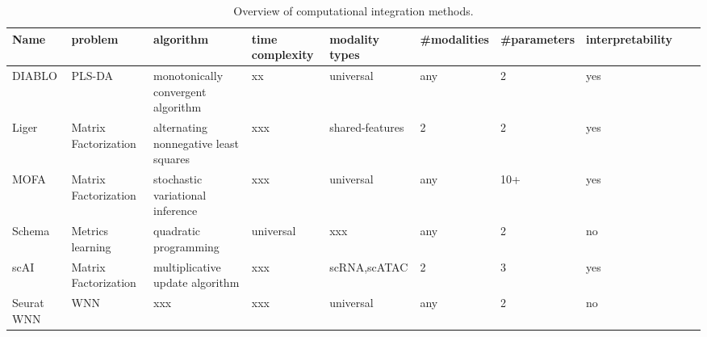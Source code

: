 \begin{table}[!ht]
    \tiny
	\centering
	\begin{tabular}{llllllllll}
		\toprule
	   Name & problem &algorithm & time complexity & modality types & \#modalities & \#parameters & interpretability \\
		\midrule
        DIABLO &PLS-DA& monotonically convergent algorithm & xx& universal & any & 2 & yes \\
        Liger &Matrix Factorization&alternating nonnegative least squares &xxx& shared-features& 2 & 2 & yes \\
        MOFA   &Matrix Factorization& stochastic variational inference &xxx& universal & any & 10+ & yes \\
        Schema &Metrics learning& quadratic programming  & universal &xxx& any & 2 & no\\
        scAI &Matrix Factorization& multiplicative update algorithm &xxx& scRNA,scATAC & 2 & 3 & yes &\\
        Seurat WNN  & WNN & xxx &xxx&universal & any & 2 & no &\\
		\bottomrule
	\end{tabular}
	\vspace{0.1cm}
	\caption[Overview of computational integration methods]{Overview of computational integration methods.}
	\label{tab:methods_integration_overview}
\end{table}

